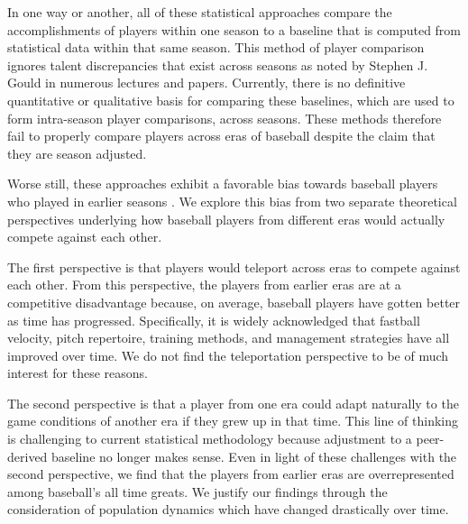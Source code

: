 \documentclass[11pt]{article}\usepackage[]{graphicx}\usepackage[]{color}
\begin{document}
In one way or another, all of these statistical approaches compare the  
accomplishments of players within one season to a baseline that 
is computed from statistical data within that same season.  
This method of player comparison ignores talent discrepancies that exist across 
seasons as noted by Stephen J. Gould in numerous lectures and papers.
Currently, there is no definitive quantitative or qualitative basis for 
comparing these baselines, which are used to form intra-season player 
comparisons, across seasons.  These methods therefore fail to properly 
compare players across eras of baseball despite the claim that they are 
season adjusted.  

Worse still, these approaches exhibit a favorable bias towards baseball 
players who played in earlier seasons 
\citep{schmidt2005concentration}.  
We explore this bias from two separate theoretical perspectives underlying how 
baseball players from different eras would actually compete against each 
other.  

The first perspective is that players would teleport across eras to 
compete against each other.  From this perspective, the players from earlier eras 
are at a competitive disadvantage because, on average, baseball players have 
gotten better as time has progressed.
Specifically, it is widely acknowledged that 
fastball velocity, pitch repertoire, training methods, and management 
strategies have all improved over time.  
We do not find the teleportation perspective to be of 
much interest for these reasons.  

The second perspective is that a player from 
one era could adapt naturally to the game conditions of another era if they 
grew up in that time. 
This line of thinking is challenging to current statistical methodology because 
adjustment to a peer-derived baseline no longer makes sense. 
Even in light of these challenges with the second perspective, we find that the 
players from earlier eras are overrepresented among baseball's all time greats.  
We justify our findings through the consideration of population dynamics which 
have changed drastically over time.  %
\end{document}
